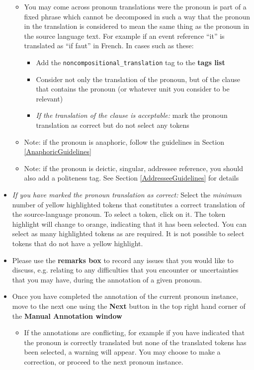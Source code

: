 \documentclass[11pt]{article} %
\newcommand\tag[1]{\texttt{#1}}
\begin{document}
\begin{itemize}
\begin{itemize}
    \item You may come across pronoun translations were the pronoun is part of a fixed phrase which cannot be decomposed in such a way that the pronoun in the translation is considered to mean the same thing as the pronoun in the source language text. For example if an event reference ``it'' is translated as ``if faut'' in French. In cases such as these:
    	\begin{itemize}
		\item Add the \tag{noncompositional\_translation} tag to the \textbf{tags list}
		\item Consider not only the translation of the pronoun, but of the clause that contains the pronoun (or whatever unit you consider to be relevant)
		\item \textit{If the translation of the clause is acceptable:} mark the pronoun translation as correct but do not select any tokens
	\end{itemize}
    \item Note: if the pronoun is anaphoric, follow the guidelines in Section \ref{AnaphoricGuidelines}
    \item Note: if the pronoun is deictic, singular, addressee reference, you should also add a politeness tag. See Section \ref{AddresseeGuidelines} for details
  \end{itemize}
  \item \textit{If you have marked the pronoun translation as correct:} Select the \textit{minimum} number of yellow highlighted tokens that constitutes a correct translation of the source-language pronoun. To select a token, click on it. The token highlight will change to orange, indicating that it has been selected. You can select as many highlighted tokens as are required. It is not possible to select tokens that do not have a yellow highlight.
  \item Please use the \textbf{remarks box} to record any issues that you would like to discuss, e.g. relating to any difficulties that you encounter or uncertainties that you may have, during the annotation of a given pronoun.
  \item Once you have completed the annotation of the current pronoun instance, move to the next one using the \textbf{Next} button in the top right hand corner of the \textbf{Manual Annotation window}
  \begin{itemize}
    \item If the annotations are conflicting, for example if you have indicated that the pronoun is correctly translated but none of the translated tokens has been selected, a warning will appear. You may choose to make a correction, or proceed to the next pronoun instance.
  \end{itemize}
\end{itemize}
\end{document}
